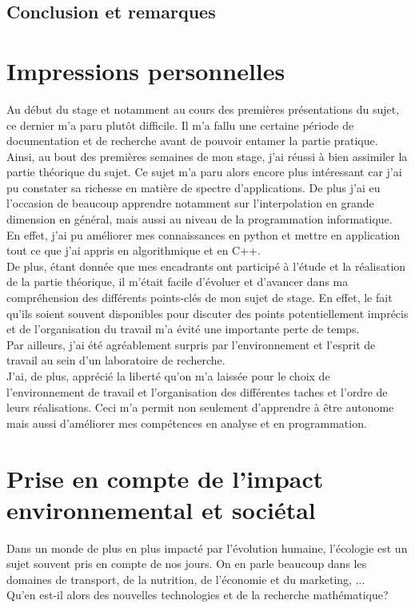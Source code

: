 \subsection{Conclusion et remarques}

\section{Impressions personnelles}\label{sec:7}
\hspace{0.5cm}
Au début du stage et notamment au cours des premières présentations du sujet, ce dernier m'a paru
plutôt difficile. Il m'a fallu une certaine période de documentation et de recherche avant de pouvoir entamer la partie pratique.
Ainsi, au bout des premières semaines de mon stage, j'ai réussi à bien assimiler la partie théorique du sujet.
Ce sujet m'a paru alors encore plus intéressant car j'ai pu constater sa richesse en matière de spectre d'applications. De plus j'ai eu l'occasion
de beaucoup apprendre notamment sur l'interpolation en grande dimension en général, mais aussi au niveau de la programmation informatique. En effet, j'ai
pu améliorer mes connaissances en python et mettre en application tout ce que j'ai appris en algorithmique et en C++.\\

De plus, étant donnée que mes encadrants ont participé à l'étude et la réalisation de la partie théorique, il m'était facile d'évoluer
et d'avancer dans ma compréhension des différents points-clés de mon sujet de stage. En effet, le fait qu'ils soient souvent disponibles
pour discuter des points potentiellement imprécis et de l'organisation du travail m'a évité une importante perte de temps.\\
Par ailleurs, j'ai été agréablement surpris par l'environnement et l'esprit de travail au sein d'un laboratoire de recherche.\\
J'ai, de plus, apprécié la liberté qu'on m'a laissée pour le choix de l'environnement de travail et l'organisation des différentes taches et l'ordre de leurs réalisations.
Ceci m'a permit non seulement d'apprendre à être autonome mais aussi d'améliorer mes compétences en analyse et en programmation.

\section{Prise en compte de l’impact environnemental et sociétal}\label{sec:8}
\hspace{0.5cm}
Dans un monde de plus en plus impacté par l’évolution humaine, l’écologie est un sujet
souvent pris en compte de nos jours. On en parle beaucoup dans les domaines de transport, de la nutrition, de l'économie et du marketing, ...\\
Qu’en est-il alors des nouvelles technologies et de la recherche mathématique?\\

